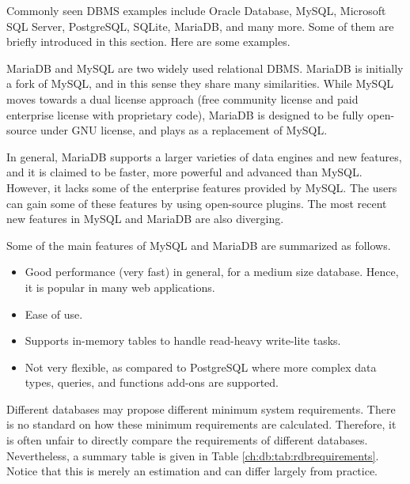Commonly seen DBMS examples include Oracle Database, MySQL, Microsoft SQL Server, PostgreSQL, SQLite, MariaDB, and many more. Some of them are briefly introduced in this section. Here are some examples.

MariaDB and MySQL are two widely used relational DBMS. MariaDB is initially a fork of MySQL, and in this sense they share many similarities. While MySQL moves towards a dual license approach (free community license and paid enterprise license with proprietary code), MariaDB is designed to be fully open-source under GNU license, and plays as a replacement of MySQL.

In general, MariaDB supports a larger varieties of data engines and new features, and it is claimed to be faster, more powerful and advanced than MySQL. However, it lacks some of the enterprise features provided by MySQL. The users can gain some of these features by using open-source plugins. The most recent new features in MySQL and MariaDB are also diverging.

Some of the main features of MySQL and MariaDB are summarized as follows.
\begin{itemize}
	\item Good performance (very fast) in general, for a medium size database. Hence, it is popular in many web applications.
	\item Ease of use.
	\item Supports in-memory tables to handle read-heavy write-lite tasks.
	\item Not very flexible, as compared to PostgreSQL where more complex data types, queries, and functions add-ons are supported.
\end{itemize}

Different databases may propose different minimum system requirements. There is no standard on how these minimum requirements are calculated. Therefore, it is often unfair to directly compare the requirements of different databases. Nevertheless, a summary table is given in Table \ref{ch:db:tab:rdbrequirements}. Notice that this is merely an estimation and can differ largely from practice.

